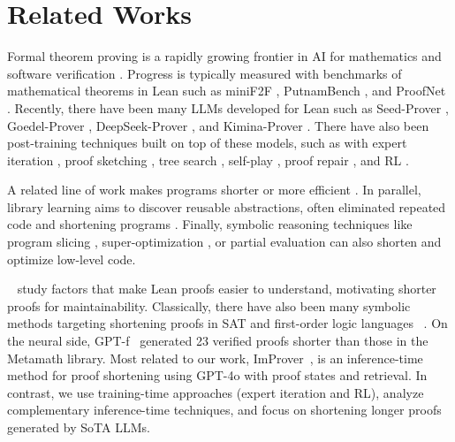 \section{Related Works}

 Formal theorem proving is a rapidly growing frontier in AI for mathematics and software verification \citep{yang2024formal, li2024survey}. Progress is typically measured with benchmarks of mathematical theorems in Lean such as miniF2F \citep{zheng2021minif2f}, PutnamBench \citep{tsoukalas2024putnambench}, and ProofNet \citep{azerbayev2023proofnet}. Recently, there have been many LLMs developed for Lean such as Seed-Prover \citep{chen2507seed}, Goedel-Prover \citep{lin2025goedel}, DeepSeek-Prover \citep{ren2025deepseek}, and Kimina-Prover \citep{wang2025kimina}.  There have also been post-training techniques built on top of these models, such as with expert iteration \citep{lin2024lean}, proof sketching \citep{cao2025reviving}, tree search \citep{lample2022hypertree, zimmer2025bourbaki}, self-play \citep{dong2025stp}, proof repair \citep{ospanov2025apollo}, and RL \citep{gloeckle2024abel}.

 A related line of work makes programs shorter or more efficient \citep{schkufza2013stochastic, alphadev, pie, gautam2024refactorbench}. In parallel, library learning aims to discover reusable abstractions, often eliminated repeated code and shortening programs \citep{ellis2023dreamcoder, grand2023lilo, kaliszyk2015learning, wang2023lego, zhou2024refactor, berlot2024library}. Finally, symbolic reasoning techniques like program slicing \citep{weiser2009program}, super-optimization \citep{sasnauskas2017souper}, or partial evaluation \citep{jones1996introduction} can also shorten and optimize low-level code. 

 ~\citet{frieder2024data} study factors that make Lean proofs easier to understand, motivating shorter proofs for maintainability. Classically, there have also been many symbolic methods targeting shortening proofs in SAT and first-order logic languages ~\citep{rahul2001proof, vyskovcil2010automated, wernhard2024investigations, gladshtein2024small,kinyon-proof-simp}. On the neural side, GPT-f~\citep{polu2020generative} generated 23 verified proofs shorter than those in the Metamath library. Most related to our work, ImProver~\citep{ahuja2024improver}, is an inference-time method for proof shortening using GPT-4o with proof states and retrieval. In contrast, we use training-time approaches (expert iteration and RL), analyze complementary inference-time techniques, and focus on shortening longer proofs generated by SoTA LLMs.